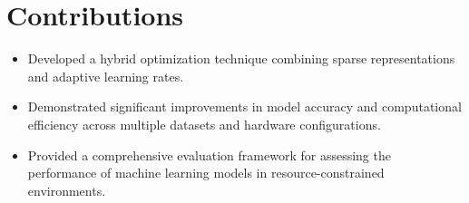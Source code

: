 \documentclass{article}
\begin{document}
\section{Contributions}
\begin{itemize}
    \item Developed a hybrid optimization technique combining sparse representations and adaptive learning rates.
    \item Demonstrated significant improvements in model accuracy and computational efficiency across multiple datasets and hardware configurations.
    \item Provided a comprehensive evaluation framework for assessing the performance of machine learning models in resource-constrained environments.
\end{itemize}
\end{document}

